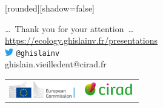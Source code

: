 
{
  [rounded][shadow=false]
  \begin{frame}
    \begin{block}{}
      \begin{center}
        \ldots~Thank you for your attention~\ldots \\
        \url{https://ecology.ghislainv.fr/presentations}\\
        \includegraphics[height=0.3cm]{figs/Twitter_Bird}
        \texttt{@ghislainv}\\
        ghislain.vieilledent@cirad.fr\\
        \begin{tabular}{C{3cm}C{3cm}}
          \includegraphics[height=0.75cm]{figs/Logo-JRC.jpg} &
          \includegraphics[height=0.75cm]{figs/Logo-Cirad.png}\\
        \end{tabular}
      \end{center}
    \end{block}
  \end{frame}
}